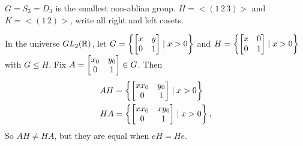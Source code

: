 \documentclass[]{article}
\begin{document}
\begin{example}
	$G = S_3 = D_3$ is the smallest non-ablian group. $H = <(1\,2\,3)>$ and $K = <(1\,2)>$, write all right and left cosets.
\end{example}
\begin{example}
	In the universe $GL_2(\mathbb{R})$, let $G = \left\{\begin{bmatrix}x&y\\0&1\end{bmatrix}\mid x>0\right\}$ and $H = \left\{\begin{bmatrix}x&0\\0&1\end{bmatrix}\mid x>0\right\}$ with $G\leq H$.
	Fix $A = \begin{bmatrix}x_0&y_0\\0&1\end{bmatrix}\in G$.
	Then
	\begin{align*}
		AH &= \left\{ \begin{bmatrix}xx_0&y_0\\0&1\end{bmatrix} \mid x>0\right\} \\
		HA &= \left\{ \begin{bmatrix}xx_0&xy_0\\0&1\end{bmatrix}\mid x>0\right\},
	\end{align*}
	So $AH\neq HA$, but they are equal when $eH = He$.
\end{example}
\end{document}
